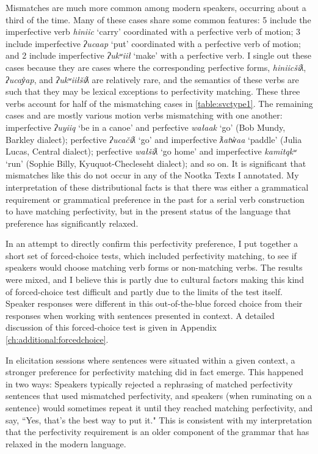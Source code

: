 Mismatches are much more common among modern speakers, occurring about a third of the time. Many of these cases share some common features: 5 include the imperfective verb \textit{hiniic} `carry' coordinated with a perfective verb of motion; 3 include imperfective \textit{ʔucaap} `put' coordinated with a perfective verb of motion; and 2 include imperfective \textit{ʔukʷiił} `make' with a perfective verb. I single out these cases because they are cases where the corresponding perfective forms, \textit{hiniicšiƛ}, \textit{ʔucay̓ap}, and \textit{ʔukʷiiłšiƛ} are relatively rare, and the semantics of these verbs are such that they may be lexical exceptions to perfectivity matching. These three verbs account for half of the mismatching cases in \cref{table:svctype1}. The remaining cases and are mostly various motion verbs mismatching with one another: imperfective \textit{ʔuyiiq} `be in a canoe' and perfective \textit{wałaak} `go' (Bob Mundy, Barkley dialect); perfective \textit{ʔucačiƛ} `go' and imperfective \textit{ƛatw̓aa} `paddle' (Julia Lucas, Central dialect); perfective \textit{wałšiƛ} `go home' and imperfective \textit{kamitqkʷ} `run' (Sophie Billy, Kyuquot-Checleseht dialect); and so on. It is significant that mismatches like this do not occur in any of the Nootka Texts I annotated. My interpretation of these distributional facts is that there was either a grammatical requirement or grammatical preference in the past for a serial verb construction to have matching perfectivity, but in the present status of the language that preference has significantly relaxed.

In an attempt to directly confirm this perfectivity preference, I put together a short set of forced-choice tests, which included perfectivity matching, to see if speakers would choose matching verb forms or non-matching verbs. The results were mixed, and I believe this is partly due to cultural factors making this kind of forced-choice test difficult and partly due to the limits of the test itself. Speaker responses were different in this out-of-the-blue forced choice from their responses when working with sentences presented in context. A detailed discussion of this forced-choice test is given in Appendix \ref{ch:additional:forcedchoice}.

In elicitation sessions where sentences were situated within a given context, a stronger preference for perfectivity matching did in fact emerge. This happened in two ways: Speakers typically rejected a rephrasing of matched perfectivity sentences that used mismatched perfectivity, and speakers (when ruminating on a sentence) would sometimes repeat it until they reached matching perfectivity, and say, ``Yes, that's the best way to put it." This is consistent with my interpretation that the perfectivity requirement is an older component of the grammar that has relaxed in the modern language.

